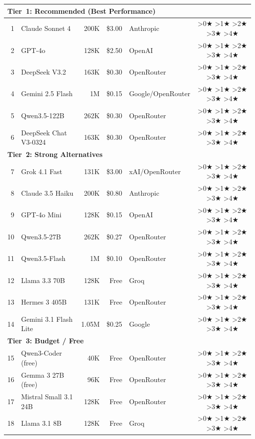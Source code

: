 \documentclass[11pt,a4paper]{article}
\newcommand{\stars}[1]{%
  \ifnum#1>0\relax\ensuremath{\bigstar}\fi%
  \ifnum#1>1\relax\ensuremath{\bigstar}\fi%
  \ifnum#1>2\relax\ensuremath{\bigstar}\fi%
  \ifnum#1>3\relax\ensuremath{\bigstar}\fi%
  \ifnum#1>4\relax\ensuremath{\bigstar}\fi%
}
\begin{document}
{\begin{longtable}{rlrrp{2.5cm}c}
\multicolumn{6}{l}{\textbf{Tier~1: Recommended (Best Performance)}} \\
\midrule
1  & Claude Sonnet 4           & 200K   & \$3.00  & Anthropic        & \stars{5} \\
2  & GPT-4o                     & 128K   & \$2.50  & OpenAI           & \stars{5} \\
3  & DeepSeek V3.2              & 163K   & \$0.30  & OpenRouter       & \stars{5} \\
4  & Gemini 2.5 Flash           & 1M     & \$0.15  & Google/OpenRouter & \stars{5} \\
5  & Qwen3.5-122B               & 262K   & \$0.30  & OpenRouter       & \stars{4} \\
6  & DeepSeek Chat V3-0324      & 163K   & \$0.30  & OpenRouter       & \stars{4} \\
\midrule
\multicolumn{6}{l}{\textbf{Tier~2: Strong Alternatives}} \\
\midrule
7  & Grok 4.1 Fast              & 131K   & \$3.00  & xAI/OpenRouter   & \stars{4} \\
8  & Claude 3.5 Haiku           & 200K   & \$0.80  & Anthropic        & \stars{4} \\
9  & GPT-4o Mini                & 128K   & \$0.15  & OpenAI           & \stars{4} \\
10 & Qwen3.5-27B                & 262K   & \$0.27  & OpenRouter       & \stars{4} \\
11 & Qwen3.5-Flash              & 1M     & \$0.10  & OpenRouter       & \stars{4} \\
12 & Llama 3.3 70B              & 128K   & Free    & Groq             & \stars{4} \\
13 & Hermes 3 405B              & 131K   & Free    & OpenRouter       & \stars{3} \\
14 & Gemini 3.1 Flash Lite      & 1.05M  & \$0.25  & Google           & \stars{4} \\
\midrule
\multicolumn{6}{l}{\textbf{Tier~3: Budget / Free}} \\
\midrule
15 & Qwen3-Coder (free)         & 40K    & Free    & OpenRouter       & \stars{3} \\
16 & Gemma 3 27B (free)         & 96K    & Free    & OpenRouter       & \stars{3} \\
17 & Mistral Small 3.1 24B      & 128K   & Free    & OpenRouter       & \stars{3} \\
18 & Llama 3.1 8B               & 128K   & Free    & Groq             & \stars{2} \\

\end{longtable}}
\end{document}
